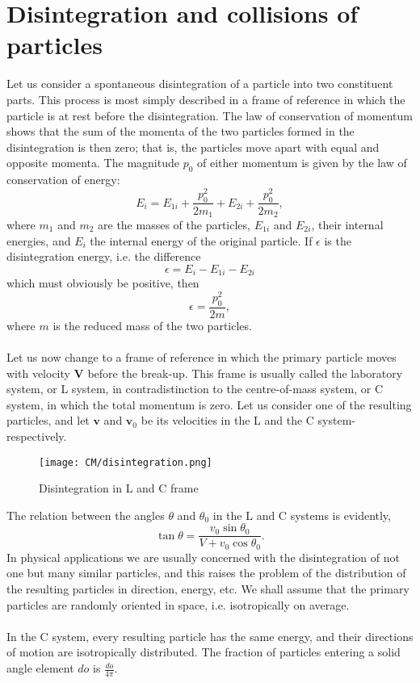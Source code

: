 \section{Disintegration and collisions of particles}
Let us consider a spontaneous disintegration of a particle into two constituent parts. 
This process is most simply described in a frame of reference in which the particle is at rest before the disintegration.
The law of conservation of momentum shows that the sum of the momenta of the two particles formed in the disintegration is then zero; that is, the particles move apart with equal and
opposite momenta. The magnitude $p_0$ of either momentum is given by the law of conservation of energy:
\[E_i = E_{1i} + \frac{p_0^2}{2m_1} + E_{2i} + \frac{p_0^2}{2m_2}, \]
where $m_1$ and $m_2$ are the masses of the particles, $E_{1i}$ and $E_{2i}$, their internal energies, and $E_{i}$ the internal energy of the original particle. If $\epsilon$ is the disintegration energy, i.e. the difference
\[\epsilon = E_i - E_{1i} - E_{2i} \]
which must obviously be positive, then
\[\epsilon = \frac{p_0^2}{2m}, \]
where $m$ is the reduced mass of the two particles.
\\ \\
Let us now change to a frame of reference in which the primary particle moves with velocity $\bm{V}$ before the break-up.
This frame is usually called the laboratory system, or L system, in contradistinction to the centre-of-mass
system, or C system, in which the total momentum is zero. 
Let us consider one of the resulting particles, and let $\bm{v}$ and $\bm{v}_0$ be its velocities in the L and
the C system-respectively. 
\begin{figure}[!h]
	\centering
	\texttt{[image: CM/disintegration.png]}
	\caption{Disintegration in L and C frame}
\end{figure}
\noindent
The relation between the angles $\theta$ and $\theta_0$ in the L and C systems is evidently,
\[\tan\theta = \frac{v_0\sin\theta_0}{V+v_0\cos\theta_0}.\]
In physical applications we are usually concerned with the disintegration of not one but many similar particles, and this raises the problem of the distribution of the resulting particles in direction, energy, etc. 
We shall assume that the primary particles are randomly oriented in space, i.e. isotropically on average.
\\ \\
In the C system, every resulting particle has the same energy, and their directions of motion are isotropically distributed. The fraction of particles entering a solid angle element $do$ is $\frac{do}{4\pi}$. 
